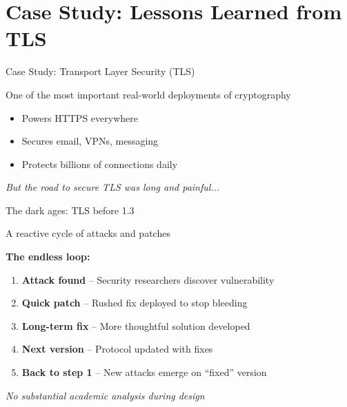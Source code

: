 \documentclass[aspectratio=169, lualatex, handout]{beamer}
\begin{document}
\section{Case Study: Lessons Learned from TLS}

\begin{frame}{Case Study: Transport Layer Security (TLS)}
	\begin{center}
		\Large
		One of the most important real-world deployments of cryptography
	\end{center}
	\vspace{1em}
	\begin{itemize}
		\item Powers HTTPS everywhere
		\item Secures email, VPNs, messaging
		\item Protects billions of connections daily
	\end{itemize}
	\vspace{1em}
	\begin{center}
		\textit{But the road to secure TLS was long and painful...}
	\end{center}
\end{frame}

\begin{frame}{The dark ages: TLS before 1.3}
	\begin{center}
		\Large
		A reactive cycle of attacks and patches
	\end{center}
	\vspace{1em}
	\textbf{The endless loop:}
	\begin{enumerate}
		\item \textbf{Attack found} -- Security researchers discover vulnerability
		\item \textbf{Quick patch} -- Rushed fix deployed to stop bleeding
		\item \textbf{Long-term fix} -- More thoughtful solution developed
		\item \textbf{Next version} -- Protocol updated with fixes
		\item \textbf{Back to step 1} -- New attacks emerge on ``fixed'' version
	\end{enumerate}
	\vspace{0.5em}
	\begin{center}
		\textit{No substantial academic analysis during design}
	\end{center}
\end{frame}
\end{document}
